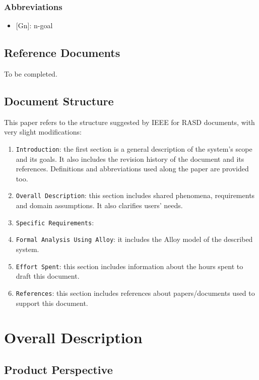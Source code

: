 \documentclass[12pt,a4paper]{article}
\begin{document}
			\subsubsection{Abbreviations}
				\begin{itemize}
				\item {[}Gn{]}: n-goal
				\end{itemize}
		
		\subsection{Reference Documents}
		To be completed.
		
		\subsection{Document Structure}
			This paper refers to the structure suggested by IEEE for RASD documents, with very slight modifications:
			\begin{enumerate}
				\item \texttt{Introduction}: the first section is a general description of the system's scope and its goals. It also includes the revision history of the document and its references. Definitions and abbreviations used along the paper are provided too.
				\item \texttt{Overall Description}: this section includes shared phenomena, requirements and domain assumptions. It also clarifies users' needs.
				\item \texttt{Specific Requirements}: 
				\item \texttt{Formal Analysis Using Alloy}: it includes the Alloy model of the described system.
				\item \texttt{Effort Spent}: this section includes information about the hours spent to draft this document. 
				\item \texttt{References}: this section includes references about papers/documents used to support this document.
			\end{enumerate}
		

	\newpage
	\section{Overall Description}
	
		\subsection{Product Perspective}
		
\end{document}
